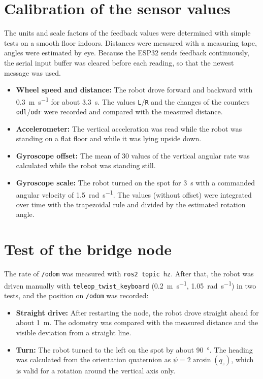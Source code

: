 \section{Calibration of the sensor values}
\label{sec:calibration_method}

The units and scale factors of the feedback values were determined with simple tests on a smooth floor indoors. Distances were measured with a measuring tape, angles were estimated by eye. Because the ESP32 sends feedback continuously, the serial input buffer was cleared before each reading, so that the newest message was used.

\begin{itemize}
  \item \textbf{Wheel speed and distance:} The robot drove forward and backward with \SI{0.3}{\metre\per\second} for about \SI{3.3}{\second}. The values \texttt{L}/\texttt{R} and the changes of the counters \texttt{odl}/\texttt{odr} were recorded and compared with the measured distance.
  \item \textbf{Accelerometer:} The vertical acceleration was read while the robot was standing on a flat floor and while it was lying upside down.
  \item \textbf{Gyroscope offset:} The mean of 30 values of the vertical angular rate was calculated while the robot was standing still.
  \item \textbf{Gyroscope scale:} The robot turned on the spot for \SI{3}{\second} with a commanded angular velocity of \SI{1.5}{\radian\per\second}. The values (without offset) were integrated over time with the trapezoidal rule and divided by the estimated rotation angle.
\end{itemize}

\section{Test of the bridge node}
\label{sec:validation_method}

The rate of \texttt{/odom} was measured with \texttt{ros2 topic hz}. After that, the robot was driven manually with \texttt{teleop\_twist\_keyboard} (\SI{0.2}{\metre\per\second}, \SI{1.05}{\radian\per\second}) in two tests, and the position on \texttt{/odom} was recorded:

\begin{itemize}
  \item \textbf{Straight drive:} After restarting the node, the robot drove straight ahead for about \SI{1}{\metre}. The odometry was compared with the measured distance and the visible deviation from a straight line.
  \item \textbf{Turn:} The robot turned to the left on the spot by about \SI{90}{\degree}. The heading was calculated from the orientation quaternion as $\psi = 2\arcsin(q_z)$, which is valid for a rotation around the vertical axis only.
\end{itemize}

